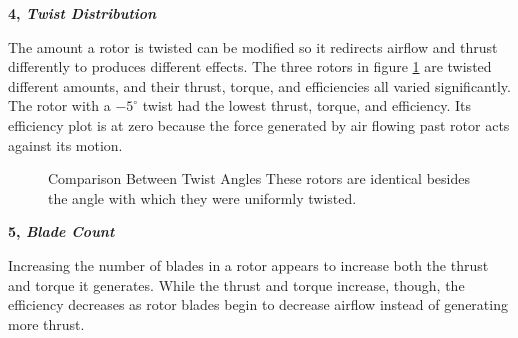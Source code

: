 \documentclass{article}
\begin{document}
\textbf{4, \emph{Twist Distribution}} \newline

The amount a rotor is twisted can be modified so it redirects airflow and thrust differently to produces different effects. The three rotors in figure \ref{fig:5} are twisted different amounts, and their thrust, torque, and efficiencies all varied significantly. The rotor with a $-5^{\circ}$ twist had the lowest thrust, torque, and efficiency. Its efficiency plot is at zero because the force generated by air flowing past rotor acts against its motion. \newline

\begin{figure}
  \centering
  \caption{Comparison Between Twist Angles \newline These rotors are identical besides the angle with which they were uniformly twisted.}
  \label{fig:5}
\end{figure}

\textbf{5, \emph{Blade Count}} \newline

Increasing the number of blades in a rotor appears to increase both the thrust and torque it generates. While the thrust and torque increase, though, the efficiency decreases as rotor blades begin to decrease airflow instead of generating more thrust.
\end{document}
